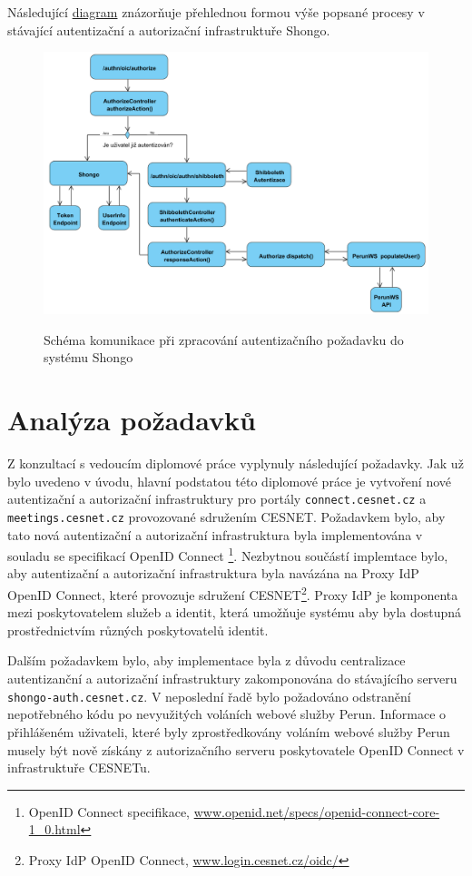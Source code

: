 \documentclass[
  printed, %
  twoside, %
  table,   %
  nolof,     %
  nolot,     %
]{fithesis3}
\begin{document}
Následující \hyperref[fig:shongoAuthnProcess]{diagram} znázorňuje přehlednou formou výše popsané procesy v stávající autentizační a autorizační infrastruktuře Shongo. 

\begin{figure}[H]
\caption{Schéma komunikace při zpracování autentizačního požadavku do systému Shongo}
\centering
\includegraphics[width=12.8cm]{pics/shongoAuthProcess} 
\label{fig:shongoAuthnProcess}
\end{figure}
\par 


\section{Analýza požadavků}
Z konzultací s vedoucím diplomové práce vyplynuly následující požadavky. Jak už bylo uvedeno v úvodu, hlavní podstatou této diplomové práce je vytvoření nové autentizační a autorizační infrastruktury pro portály \texttt{connect.cesnet.cz} a \texttt{meetings.cesnet.cz} provozované sdružením CESNET. Požadavkem bylo, aby tato nová autentizační a autorizační infrastruktura byla implementována v souladu se specifikací OpenID Connect  \footnote{OpenID Connect specifikace, \url{www.openid.net/specs/openid-connect-core-1_0.html}}. Nezbytnou součástí implemtace bylo, aby autentizační a autorizační infrastruktura byla navázána na Proxy IdP OpenID Connect, které provozuje sdružení CESNET\footnote{Proxy IdP OpenID Connect, \url{www.login.cesnet.cz/oidc/}}. Proxy IdP je komponenta mezi poskytovatelem služeb a identit, která umožňuje systému aby byla dostupná prostřednictvím různých poskytovatelů identit. \par

Dalším požadavkem bylo, aby implementace byla z důvodu centralizace autentizanční a autorizační infrastruktury zakomponována do stávajícího serveru \texttt{shongo-auth.cesnet.cz}. V neposlední řadě bylo požadováno odstranění nepotřebného kódu po nevyužitých voláních webové služby Perun. Informace o přihlášeném uživateli, které byly zprostředkovány voláním webové služby Perun musely být nově získány z autorizačního serveru poskytovatele OpenID Connect v infrastruktuře CESNETu.     
\end{document}
